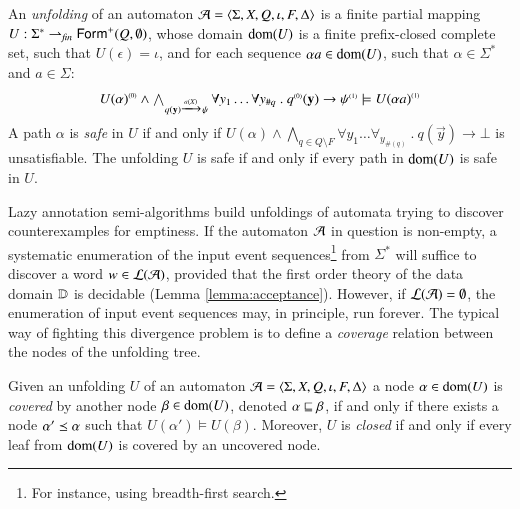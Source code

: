 \begin{definition}\label{def:unfolding}
  An \emph{unfolding} of an automaton $\mathcal{A} =
  \langle \Sigma,X,Q,\iota,F,\Delta \rangle$ is a finite partial mapping $U :
  \Sigma^* \rightharpoonup_{\mathit{fin}} \mathsf{Form}^+(Q,\emptyset)$,
  whose domain $\mathrm{dom}(U)$ is a finite prefix-closed complete set, such
  that $U(\epsilon) = \iota$, and for each sequence $\alpha a \in
  \mathrm{dom}(U)$, such that $\alpha \in \Sigma^*$ and $a \in \Sigma$:
  \[\begin{array}{c}
  {U(\alpha)}^{\scriptscriptstyle{({0})}} \wedge
  \bigwedge_{q(\mathbf y) \xrightarrow{{\scriptscriptstyle a(X)}}_{{\scriptstyle }} \psi} \forall y_1 \ldots
  \forall y_{\#q} ~.~ {q}^{\scriptscriptstyle{({0})}}(\mathbf y) \rightarrow
  {\psi}^{\scriptscriptstyle{({1})}} \models {U(\alpha a)}^{\scriptscriptstyle{({1})}}
  \end{array}\]
  A path $\alpha$ is \emph{safe} in $U$ if and only if $U(\alpha)
  \wedge \bigwedge_{q \in Q \setminus F} \forall y_1 \ldots
  \forall_{y_{\#(q)}} ~.~ q(\vec{y}) \rightarrow \bot$ is
  unsatisfiable. The unfolding $U$ is safe if and only if every path
  in $\mathrm{dom}(U)$ is safe in $U$.
\end{definition}

Lazy annotation semi-algorithms \cite{McMillan06,McMillan14} build
unfoldings of automata trying to discover counterexamples for
emptiness. If the automaton $\mathcal{A}$ in question is non-empty, a
systematic enumeration of the input event sequences\footnote{For
  instance, using breadth-first search.} from $\Sigma^*$ will suffice
to discover a word $w \in {\mathcal L}({\mathcal{A}})$, provided that the first order
theory of the data domain $\mathbb{D}$ is decidable (Lemma
\ref{lemma:acceptance}). However, if ${\mathcal L}({\mathcal{A}}) = \emptyset$, the
enumeration of input event sequences may, in principle, run
forever. The typical way of fighting this divergence problem is to
define a \emph{coverage} relation between the nodes of the unfolding
tree.

\begin{definition}\label{def:coverage}
  Given an unfolding $U$ of an automaton $\mathcal{A} =
  \langle \Sigma,X,Q,\iota,F,\Delta \rangle$ a node $\alpha \in \mathrm{dom}(U)$ is
  \emph{covered} by another node $\beta \in \mathrm{dom}(U)$, denoted $\alpha
  \sqsubseteq \beta$, if and only if there exists a node $\alpha' \preceq
  \alpha$ such that $U(\alpha') \models U(\beta)$. Moreover, $U$ is
  \emph{closed} if and only if every leaf from $\mathrm{dom}(U)$ is covered by
  an uncovered node.
\end{definition}


